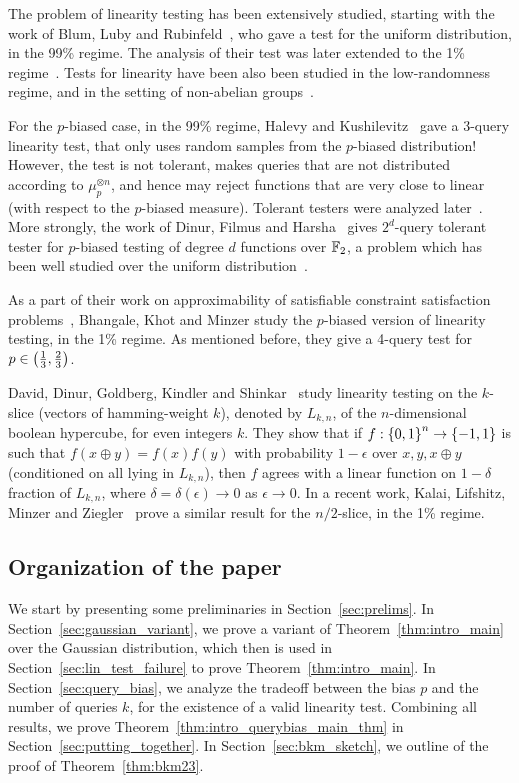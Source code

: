 The problem of linearity testing has been extensively studied, starting with the work of Blum, Luby and Rubinfeld~\cite{BLR93}, who gave a test for the uniform distribution, in the 99\% regime.
The analysis of their test was later extended to the 1\% regime~\cite{BCHKS96, KLX10}.
Tests for linearity have been also been studied in the low-randomness regime, and in the setting of non-abelian groups~\cite{BSVW03,BCLR08,SW06}.

For the $p$-biased case, in the 99\% regime, Halevy and Kushilevitz~\cite{HK07} gave a 3-query linearity test, that only uses random samples from the $p$-biased distribution!
However, the test is not tolerant, makes queries that are not distributed according to $\mu_p^{\otimes n}$, and hence may reject functions that are very close to linear (with respect to the $p$-biased measure).
Tolerant testers were analyzed later~\cite{KS09, DFH19}.
More strongly, the work of Dinur, Filmus and Harsha~\cite{DFH19} gives $2^d$-query tolerant tester for $p$-biased testing of degree $d$ functions over $\mathbb{F}_2$, a problem which has been well studied over the uniform distribution~\cite{AKKLR05, BKSSZ10}.

As a part of their work on approximability of satisfiable constraint satisfaction problems~\cite{BKM22, BKM23a, BKM23b, BKM24a, BKM24b}, Bhangale, Khot and Minzer study the $p$-biased version of linearity testing, in the 1\% regime.
As mentioned before, they give a 4-query test for $p\in \left( \frac{1}{3},\frac{2}{3} \right)$. 

David, Dinur, Goldberg, Kindler and Shinkar~\cite{DDGKS17} study linearity testing on the $k$-slice (vectors of hamming-weight $k$), denoted by $L_{k,n}$, of the $n$-dimensional boolean hypercube, for even integers $k$. 
They show that if $f:\left\{ 0,1 \right\}^n\to \left\{ -1,1 \right\}$ is such that $f(x\oplus y) = f(x)f(y)$ with probability $1-\epsilon$ over $x,y,x\oplus y$ (conditioned on all lying in $L_{k,n}$), then $f$ agrees with a linear function on $1-\delta$ fraction of $L_{k,n}$, where $\delta = \delta(\epsilon)\to 0$ as $\epsilon \to 0$.
In a recent work, Kalai, Lifshitz, Minzer and Ziegler~\cite{KLMZ24} prove a similar result for the $n/2$-slice, in the 1\% regime.

\subsection{Organization of the paper}

We start by presenting some preliminaries in Section~\ref{sec:prelims}.
In Section~\ref{sec:gaussian_variant}, we prove a variant of Theorem~\ref{thm:intro_main} over the Gaussian distribution, which then is used in Section~\ref{sec:lin_test_failure} to prove Theorem~\ref{thm:intro_main}.
In Section~\ref{sec:query_bias}, we analyze the tradeoff between the bias $p$ and the number of queries $k$, for the existence of a valid linearity test.
Combining all results, we prove Theorem~\ref{thm:intro_querybias_main_thm} in Section~\ref{sec:putting_together}.
In Section~\ref{sec:bkm_sketch}, we outline of the proof of Theorem~\ref{thm:bkm23}.
